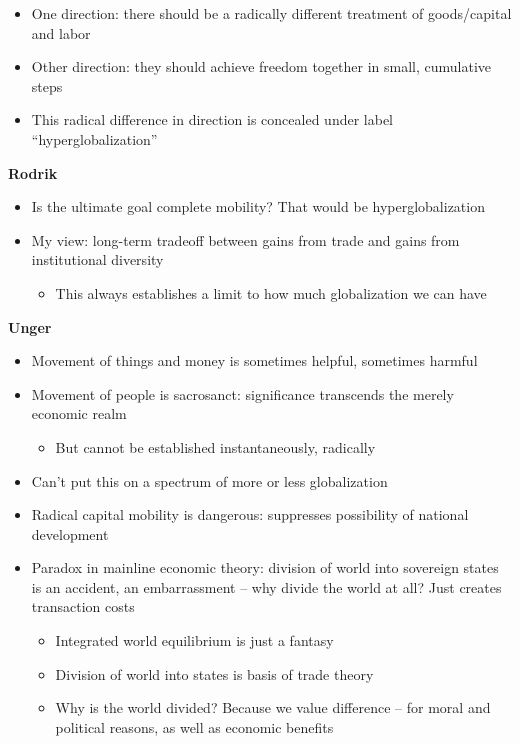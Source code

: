 \begin{itemize}
\tightlist
\item
  One direction: there should be a radically different treatment of
  goods/capital and labor
\item
  Other direction: they should achieve freedom together in small,
  cumulative steps
\item
  This radical difference in direction is concealed under label
  ``hyperglobalization''
\end{itemize}

\textbf{Rodrik}

\begin{itemize}
\tightlist
\item
  Is the ultimate goal complete mobility? That would be
  hyperglobalization
\item
  My view: long-term tradeoff between gains from trade and gains from
  institutional diversity

  \begin{itemize}
  \tightlist
  \item
    This always establishes a limit to how much globalization we can
    have
  \end{itemize}
\end{itemize}

\textbf{Unger}

\begin{itemize}
\tightlist
\item
  Movement of things and money is sometimes helpful, sometimes harmful
\item
  Movement of people is sacrosanct: significance transcends the merely
  economic realm

  \begin{itemize}
  \tightlist
  \item
    But cannot be established instantaneously, radically
  \end{itemize}
\item
  Can't put this on a spectrum of more or less globalization
\item
  Radical capital mobility is dangerous: suppresses possibility of
  national development
\item
  Paradox in mainline economic theory: division of world into sovereign
  states is an accident, an embarrassment -- why divide the world at
  all? Just creates transaction costs

  \begin{itemize}
  \tightlist
  \item
    Integrated world equilibrium is just a fantasy
  \item
    Division of world into states is basis of trade theory
  \item
    Why is the world divided? Because we value difference -- for moral
    and political reasons, as well as economic benefits
  \end{itemize}
\end{itemize}

